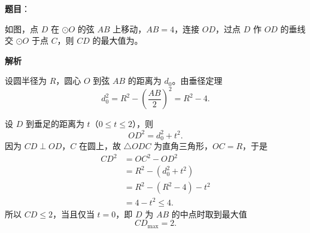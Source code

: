 \begin{answer}


\end{answer}
\begin{answer}

\textbf{题目}：

如图，点 $D$ 在 $\odot O$ 的弦 $AB$ 上移动，$AB=4$，连接 $OD$，过点 $D$ 作 $OD$ 的垂线交 $\odot O$ 于点 $C$，则 $CD$ 的最大值为\gkblank{}。
\nopagebreak[4]
\begin{center}\end{center}
\nopagebreak[4]
\textbf{解析}

设圆半径为 $R$，圆心 $O$ 到弦 $AB$ 的距离为 $d_0$。由垂径定理
\nopagebreak[4]
\[d_0^2=R^2-\left(\frac{AB}{2}\right)^2=R^2-4.\]

设 $D$ 到垂足的距离为 $t$（$0\leqslant t\leqslant2$），则
\nopagebreak[4]
\[OD^2=d_0^2+t^2.\]
因为 $CD\perp OD$，$C$ 在圆上，故 $\triangle ODC$ 为直角三角形，$OC=R$，于是
\nopagebreak[4]
\[\begin{aligned}
CD^2&=OC^2-OD^2\\
&=R^2-\left(d_0^2+t^2\right)\\
&=R^2-\left(R^2-4\right)-t^2\\
&=4-t^2\leqslant4.
\end{aligned}\]
所以 $CD\leqslant2$，当且仅当 $t=0$，即 $D$ 为 $AB$ 的中点时取到最大值
\nopagebreak[4]
\[CD_{\max}=2.\]


\end{answer}
